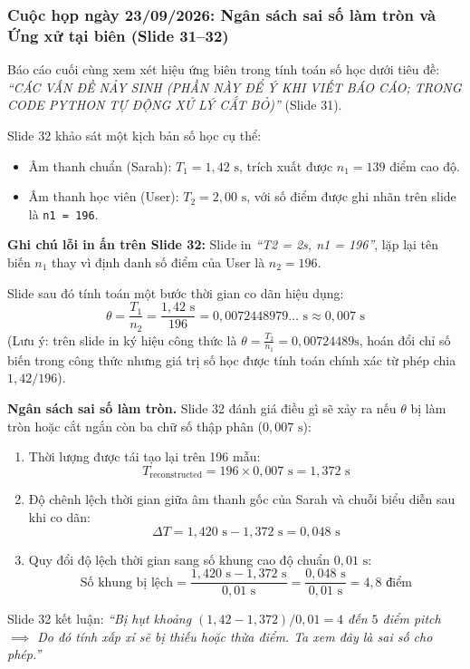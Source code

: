 \documentclass[11pt,a4paper]{article}
\begin{document}
\subsubsection*{Cuộc họp ngày 23/09/2026: Ngân sách sai số làm tròn và Ứng xử tại biên (Slide 31--32)}

Báo cáo cuối cùng xem xét hiệu ứng biên trong tính toán số học dưới tiêu đề: \textit{``CÁC VẤN ĐỀ NẢY SINH (PHẦN NÀY ĐỂ Ý KHI VIẾT BÁO CÁO; TRONG CODE PYTHON TỰ ĐỘNG XỬ LÝ CẮT BỎ)''} (Slide 31).

Slide 32 khảo sát một kịch bản số học cụ thể:
\begin{itemize}
    \item Âm thanh chuẩn (Sarah): $T_1 = 1{,}42\text{ s}$, trích xuất được $n_1 = 139$ điểm cao độ.
    \item Âm thanh học viên (User): $T_2 = 2{,}00\text{ s}$, với số điểm được ghi nhãn trên slide là \texttt{n1 = 196}.
\end{itemize}
\textbf{Ghi chú lỗi in ấn trên Slide 32:} Slide in \textit{``T2 = 2s, n1 = 196''}, lặp lại tên biến $n_1$ thay vì định danh số điểm của User là $n_2 = 196$.

Slide sau đó tính toán một bước thời gian co dãn hiệu dụng:
\begin{equation}
\theta = \frac{T_1}{n_2} = \frac{1{,}42\text{ s}}{196} = 0{,}0072448979\dots\text{ s} \approx 0{,}007\text{ s}
\end{equation}
(Lưu ý: trên slide in ký hiệu công thức là $\theta = \frac{T_2}{n_1} = 0{,}00724489\text{s}$, hoán đổi chỉ số biến trong công thức nhưng giá trị số học được tính toán chính xác từ phép chia $1{,}42 / 196$).

\textbf{Ngân sách sai số làm tròn.} Slide 32 đánh giá điều gì sẽ xảy ra nếu $\theta$ bị làm tròn hoặc cắt ngắn còn ba chữ số thập phân ($0{,}007\text{ s}$):
\begin{enumerate}
    \item Thời lượng được tái tạo lại trên 196 mẫu:
    \begin{equation}
    T_{\text{reconstructed}} = 196 \times 0{,}007\text{ s} = 1{,}372\text{ s}
    \end{equation}
    \item Độ chênh lệch thời gian giữa âm thanh gốc của Sarah và chuỗi biểu diễn sau khi co dãn:
    \begin{equation}
    \Delta T = 1{,}420\text{ s} - 1{,}372\text{ s} = 0{,}048\text{ s}
    \end{equation}
    \item Quy đổi độ lệch thời gian sang số khung cao độ chuẩn $0{,}01\text{ s}$:
    \begin{equation}
    \text{Số khung bị lệch} = \frac{1{,}420\text{ s} - 1{,}372\text{ s}}{0{,}01\text{ s}} = \frac{0{,}048\text{ s}}{0{,}01\text{ s}} = 4{,}8\text{ điểm}
    \end{equation}
\end{enumerate}
Slide 32 kết luận: \textit{``Bị hụt khoảng $(1{,}42 - 1{,}372) / 0{,}01 = 4$ đến $5$ điểm pitch $\implies$ Do đó tính xấp xỉ sẽ bị thiếu hoặc thừa điểm. Ta xem đây là sai số cho phép.''}
\end{document}
